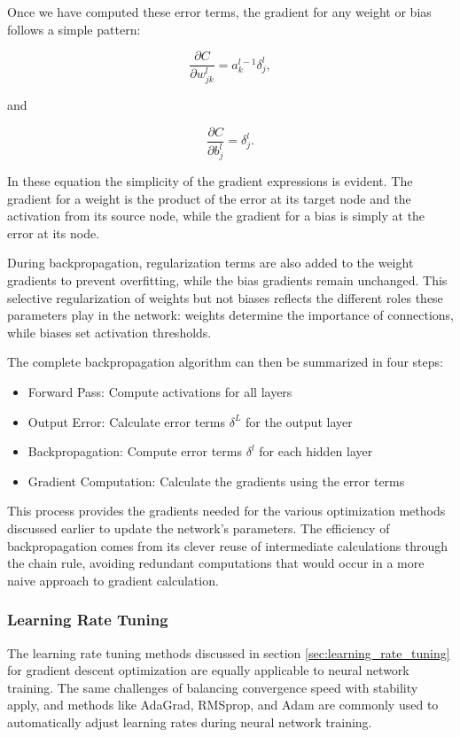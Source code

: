 \documentclass[aps,pra,english,notitlepage,reprint,nofootinbib]{revtex4-1}  %
\begin{document}
Once we have computed these error terms, the gradient for any weight or bias follows a simple pattern:

\begin{equation}
    \frac{\partial C}{\partial w_{jk}^l} = a_k^{l-1}\delta_j^l,
\end{equation}

and

\begin{equation}
    \frac{\partial C}{\partial b_j^l} = \delta_j^l.
\end{equation}

In these equation the simplicity of the gradient expressions is evident. The gradient for a weight is the product of the error at its target node and the activation from its source node, while the gradient for a bias is simply at the error at its node.

During backpropagation, regularization terms are also added to the weight gradients to prevent overfitting, while the bias gradients remain unchanged. This selective regularization of weights but not biases reflects the different roles these parameters play in the network: weights determine the importance of connections, while biases set activation thresholds.

The complete backpropagation algorithm can then be summarized in four steps:

\begin{itemize}
    \item Forward Pass: Compute activations for all layers
    \item Output Error: Calculate error terms \( \delta^L \) for the output layer
    \item Backpropagation: Compute error terms \( \delta^l \) for each hidden layer
    \item Gradient Computation: Calculate the gradients using the error terms
\end{itemize}

This process provides the gradients needed for the various optimization methods discussed earlier to update the network's parameters. The efficiency of backpropagation comes from its clever reuse of intermediate calculations through the chain rule, avoiding redundant computations that would occur in a more naive approach to gradient calculation.

\subsubsection{Learning Rate Tuning}
The learning rate tuning methods discussed in section \ref{sec:learning_rate_tuning} for gradient descent optimization are equally applicable to neural network training. The same challenges of balancing convergence speed with stability apply, and methods like AdaGrad, RMSprop, and Adam are commonly used to automatically adjust learning rates during neural network training.
\end{document}
